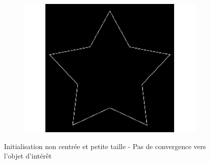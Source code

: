 \begin{figure}[H]
\begin{subfigure}[c]{0.3\linewidth}
\includegraphics[width=\textwidth]{Chapters/Images/Init/vfcus3}
\caption{}
\end{subfigure}
\caption{Initialisation non centrée et petite taille - Pas de convergence vers l'objet d'intérêt}
\end{figure}

